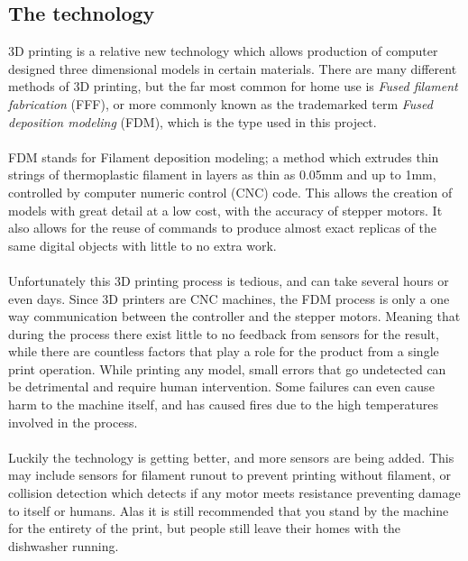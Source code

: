 \documentclass[a4paper, 12pt]{article}
\newcommand{\mysubsection}[1]{\subsection*{#1} \addcontentsline{toc}{subsection}{#1}}
\begin{document}
    \mysubsection{The technology}
    3D printing is a relative new technology which allows production of computer designed three dimensional models
    in certain materials.
    There are many different methods of 3D printing, but the far most common for home use is \textit{Fused filament
    fabrication} (FFF), or more commonly known as the trademarked term \textit{Fused deposition modeling} (FDM),
    which is the type used in this project.
    \\\\
    FDM stands for Filament deposition modeling;
    a method which extrudes thin strings of thermoplastic filament
    in layers as thin as 0.05mm and up to 1mm, controlled by computer numeric control (CNC) code.
    This allows the creation of models with great detail at a low cost, with the accuracy of stepper motors.
    It also allows for the reuse of commands to produce almost exact replicas of the same digital objects with
    little to no extra work.
    \\\\
    Unfortunately this 3D printing process is tedious, and can take several hours or even days.
    Since 3D printers are CNC machines, the FDM process is only a one way communication between the controller
    and the stepper motors.
    Meaning that during the process there exist little to no feedback from sensors for the result, while there are countless
    factors that play a role for the product from a single print operation.
    While printing any model, small errors that go undetected can be detrimental and require human intervention.
    Some failures can even cause harm to the machine itself, and has caused fires due to the high temperatures involved in
    the process.
    \\\\
    Luckily the technology is getting better, and more sensors are being added.
    This may include sensors for filament runout to prevent printing without filament, or collision detection which detects
    if any motor meets resistance preventing damage to itself or humans.
    Alas it is still recommended that you stand by the machine for the entirety of the print, but people still leave their
    homes with the dishwasher running.
\end{document}
